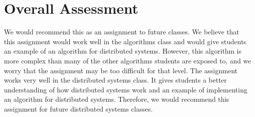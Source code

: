 \documentclass [11pt] {article}
\begin{document}
	\section {Overall Assessment}
	\qquad We would recommend this as an assignment to future classes.  We believe that this assignment would work well in the algorithms class and would give students an example of an algorithm for distributed systems.  However, this algorithm is more complex than many of the other algorithms students are exposed to, and we worry that the assignment may be too difficult for that level.  The assignment works very well in the distributed systems class.  It gives students a better understanding of how distributed systems work and an example of implementing an algorithm for distributed systems.  Therefore, we would recommend this assignment for future distributed systems classes.
\end{document}
